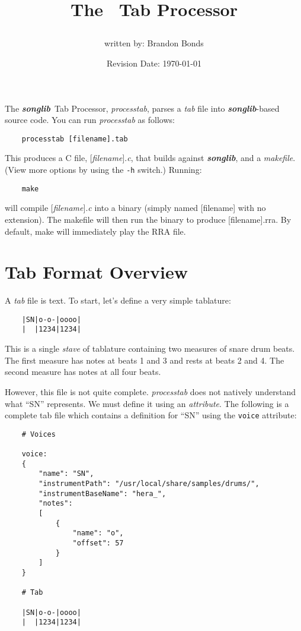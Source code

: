 \documentclass{article}
\title{The \Songlib\ Tab Processor\\
\date{Revision Date: \today}}
\author{written by: Brandon Bonds}
\newcommand\songlib {{\it\bf songlib}}
\begin{document}
\maketitle

\W\subsubsection*{}
\W\htmlrule

The \songlib\ Tab Processor, {\it processtab}, parses a {\it tab} file into
\songlib-based source code.  You can run {\it processtab} as follows:

\begin{verbatim}
    processtab [filename].tab
\end{verbatim}

This produces a C file, [{\it filename}].{\it c}, that builds against \songlib,
and a {\it makefile}.  (View more options by using the \verb!-h! switch.)
Running:

\begin{verbatim}
    make
\end{verbatim}

will compile [{\it filename}].{\it c} into a binary (simply named
[filename] with no extension).  The makefile will then run the binary
to produce [filename].rra.  By default, make will immediately play the
RRA file.

\section*{Tab Format Overview}

A {\it tab} file is text.  To start, let's define a very simple tablature:

\begin{verbatim}
    |SN|o-o-|oooo|
    |  |1234|1234|
\end{verbatim}

This is a single {\it stave} of tablature containing two measures of snare drum 
beats.  The first measure has notes at beats 1 and 3 and rests at beats 2 and 4.
The second measure has notes at all four beats.

However, this file is not quite complete.  {\it processtab} does not natively
understand what ``SN'' represents.  We must define it using an {\it attribute}.
The following is a complete tab file which contains a definition for
``SN'' using the \verb!voice! attribute:

\begin{verbatim}
    # Voices

    voice:
    {
        "name": "SN",
        "instrumentPath": "/usr/local/share/samples/drums/",
        "instrumentBaseName": "hera_",
        "notes":
        [
            {
                "name": "o",
                "offset": 57
            }
        ]
    }

    # Tab

    |SN|o-o-|oooo|
    |  |1234|1234|
\end{verbatim}
\end{document}
